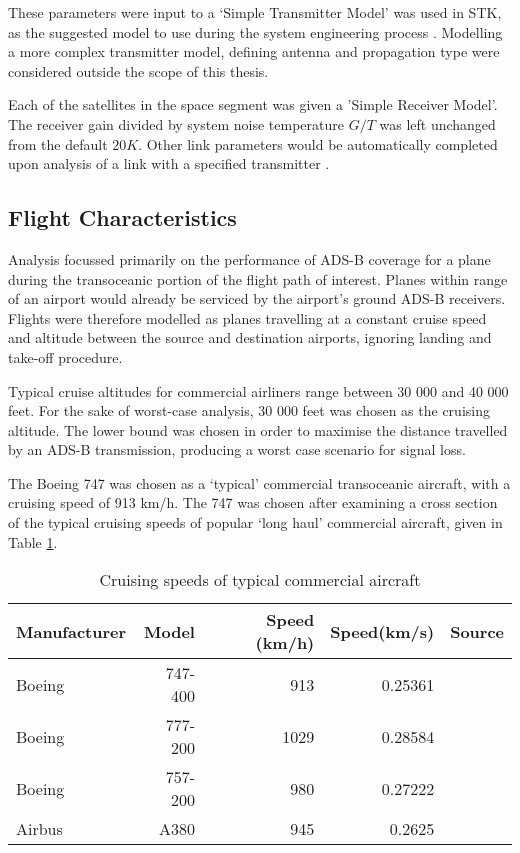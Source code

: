 These parameters were input to a `Simple Transmitter Model' was used in STK, as the suggested model to use during the system engineering process \cite{STKOnline}. Modelling a more complex transmitter model, defining antenna and propagation type were considered outside the scope of this thesis.

Each of the satellites in the space segment was given a 'Simple Receiver Model'. The receiver gain divided by system noise temperature $G/T$ was left unchanged from the default $20K$. Other link parameters would be automatically completed upon analysis of a link with a specified transmitter \cite{STKOnline}. 

\subsection{Flight Characteristics}
Analysis focussed primarily on the performance of ADS-B coverage for a plane during the transoceanic portion of the flight path of interest. Planes within range of an airport would already be serviced by the airport's ground ADS-B receivers. Flights were therefore modelled as planes travelling at a constant cruise speed and altitude between the source and destination airports, ignoring landing and take-off procedure.  

Typical cruise altitudes for commercial airliners range between 30 000 and 40 000 feet. For the sake of worst-case analysis, 30 000 feet was chosen as the cruising altitude. The lower bound was chosen in order to maximise the distance travelled by an ADS-B transmission, producing a worst case scenario for signal loss.

The Boeing 747 was chosen as a `typical' commercial transoceanic aircraft, with a cruising speed of 913 km/h. The 747 was chosen after examining a cross section of the typical cruising speeds of popular `long haul' commercial aircraft,  given in Table \ref{tab:flightSpecs}.

\begin{table}[H]
  \centering
  \caption{Cruising speeds of typical commercial aircraft}
    \begin{tabular}{lrrrr}
    \toprule
    Manufacturer & Model & Speed (km/h) & Speed(km/s) & Source \\
    \midrule
    Boeing & 747-400 & 913   & 0.25361 & \cite{Boeing747}  \\
    Boeing & 777-200 & 1029 & 0.28584 &  \cite{Boeing777} \\
    Boeing & 757-200 & 980 & 0.27222 & \cite{Boeing757}  \\
    Airbus & A380  & 945   & 0.2625 &  \cite{Frawley2014} \\
    \bottomrule
    \end{tabular}%
  \label{tab:flightSpecs}%
\end{table}%


